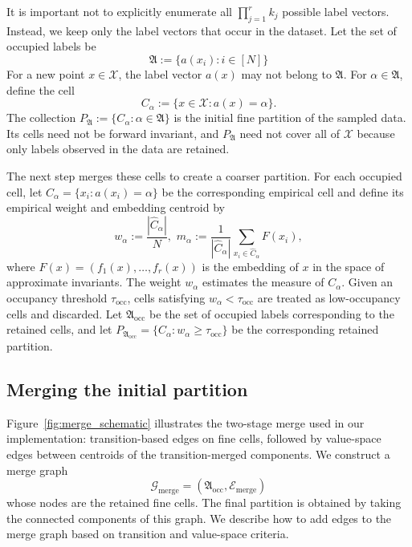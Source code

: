 \documentclass[letterpaper, 10 pt, conference]{ieeeconf}
\newcommand{\Ec}{\mathcal{E}}
\newcommand{\Gc}{\mathcal{G}}
\newcommand{\Xc}{\mathcal{X}}
\begin{document}
It is important not to explicitly enumerate all $\prod_{j=1}^r k_j$ possible label vectors. Instead, we keep only the label vectors that occur in the dataset. Let the set of occupied labels be
\begin{equation}
    \mathfrak A :=\{a(x_i):i\in[N]\}
\end{equation}
For a new point $x\in\Xc$, the label vector $a(x)$ may not belong to $\mathfrak A$. For $\alpha\in\mathfrak A$, define the cell
\begin{equation}
    C_\alpha :=\{x \in \Xc : a(x)=\alpha\}.
\end{equation}
The collection $P_\mathfrak{A}:=\{C_\alpha:\alpha\in\mathfrak A\}$ is the initial fine partition of the sampled data. Its cells need not be forward invariant, and $P_\mathfrak{A}$ need not cover all of $\Xc$ because only labels observed in the data are retained.

The next step merges these cells to create a coarser partition. For each occupied cell, let $\widehat C_\alpha = \{x_i : a(x_i)=\alpha\}$ be the corresponding empirical cell and define its empirical weight and embedding centroid by
\begin{equation}
    w_\alpha:=\frac{|\widehat C_\alpha|}{N}, \,\,     m_\alpha :=\frac{1}{|\widehat C_\alpha|} \sum_{x_i\in\widehat C_\alpha}F(x_i),
\label{eq:centroid_definition}
\end{equation}
where $F(x)=(f_1(x),\ldots,f_r(x))$ is the embedding of $x$ in the space of approximate invariants. The weight $w_\alpha$ estimates the measure of $C_\alpha$. Given an occupancy threshold $\tau_{\text{occ}}$, cells satisfying $w_\alpha<\tau_{\text{occ}}$ are treated as low-occupancy cells and discarded. Let $\mathfrak A_{\text{occ}}$ be the set of occupied labels corresponding to the retained cells, and let $P_{\mathfrak A_{\text{occ}}} = \{C_\alpha:w_\alpha\geq\tau_{\text{occ}}\}$ be the corresponding retained partition. 

\subsection{Merging the initial partition}

Figure~\ref{fig:merge_schematic} illustrates the two-stage merge used in our implementation: transition-based edges on fine cells, followed by value-space edges between centroids of the transition-merged components. We construct a merge graph
\begin{equation}
    \Gc_{\text{merge}}=(\mathfrak A_{\text{occ}},\Ec_{\text{merge}})
\end{equation}
whose nodes are the retained fine cells. The final partition is obtained by taking the connected components of this graph. We describe how to add edges to the merge graph based on transition and value-space criteria.
\end{document}
